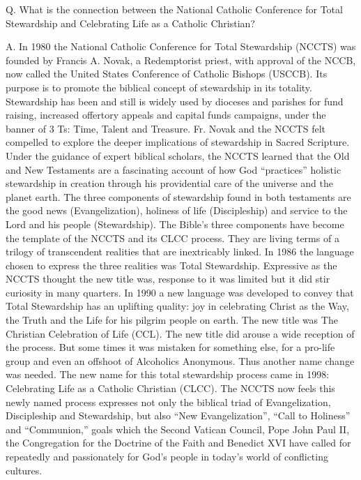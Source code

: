 \documentclass[oneside]{book}
\begin{document}
Q. What is the connection between the National Catholic Conference for Total
Stewardship and Celebrating Life as a Catholic Christian?

A. In 1980 the National Catholic Conference for Total Stewardship (NCCTS) was
founded by Francis A. Novak, a Redemptorist priest, with approval of the NCCB,
now called the United States Conference of Catholic Bishops (USCCB). Its purpose
is to promote the biblical concept of stewardship in its totality. Stewardship
has been and still is widely used by dioceses and parishes for fund raising,
increased offertory appeals and capital funds campaigns, under the banner of 3
Ts: Time, Talent and Treasure.
Fr. Novak and the NCCTS felt compelled to explore the deeper implications of
stewardship in Sacred Scripture. Under the guidance of expert biblical scholars,
the NCCTS learned that the Old and New Testaments are a fascinating account of
how God ``practices'' holistic stewardship in creation through his providential
care of the universe and the planet earth. The three components of stewardship
found in both testaments are the good news (Evangelization), holiness of life
(Discipleship) and service to the Lord and his people (Stewardship). The Bible's
three components have become the template of the NCCTS and its CLCC
process. They are living terms of a trilogy of transcendent realities that are
inextricably linked. In 1986 the language chosen to express the three realities
was Total Stewardship.
Expressive as the NCCTS thought the new title was, response to it was limited
but it did stir curiosity in many quarters. In 1990 a new language was developed
to convey that Total Stewardship has an uplifting quality: joy in celebrating
Christ as the Way, the Truth and the Life for his pilgrim people on earth. The
new title was The Christian Celebration of Life (CCL). The new title did arouse
a wide reception of the process. But some times it was mistaken for something
else, for a pro-life group and even an offshoot of Alcoholics Anonymous. Thus
another name change was needed.
The new name for this total stewardship process came in 1998: Celebrating Life
as a Catholic Christian (CLCC). The NCCTS now feels this newly named process
expresses not only the biblical triad of Evangelization, Discipleship and
Stewardship, but also ``New Evangelization'', ``Call to Holiness'' and
``Communion,'' goals which the Second Vatican Council, Pope John Paul II, the
Congregation for the Doctrine of the Faith and Benedict XVI have called for
repeatedly and passionately for God's people in today's world of conflicting
cultures.
\end{document}
